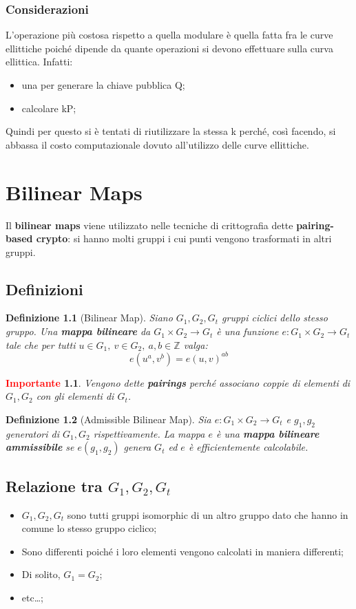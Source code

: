 \documentclass{book}
\newtheorem{Definizione}{\textbf{Definizione}}
\newtheorem*{Importante}{\textbf{\textcolor{red}{Importante}}}
\begin{document}
\subsection{Considerazioni}
L'operazione più costosa rispetto a quella modulare è quella fatta fra le curve ellittiche poiché dipende da quante operazioni si devono effettuare sulla curva ellittica. Infatti:
\begin{itemize}
	\item una per generare la chiave pubblica Q\@;
	\item calcolare kP\@;
\end{itemize}
Quindi per questo si è tentati di riutilizzare la stessa k perché, così facendo, si abbassa il costo computazionale dovuto all'utilizzo delle curve ellittiche.
\chapter{Bilinear Maps}
Il \textbf{bilinear maps} viene utilizzato nelle tecniche di crittografia dette \textbf{pairing-based crypto}: si hanno molti gruppi i cui punti vengono trasformati in altri gruppi.
\section{Definizioni}
\begin{Definizione}[Bilinear Map]
	Siano \(G_{1},G_{2},G_{t}\) gruppi ciclici dello stesso gruppo. Una \textbf{mappa bilineare} da \(G_{1}\times G_{2}\rightarrow G_{t}\) è una funzione \(e:G_{1}\times G_{2}\rightarrow G_{t}\) tale che per tutti \(u\in G_{1},\ v\in G_{2},\ a,b\in \mathbb{Z}\) valga:\begin{equation*}
		e(u^{a},v^{b})={e(u,v)}^{ab}
	\end{equation*}
\end{Definizione}
\begin{Importante}
	Vengono dette \textbf{pairings} perché associano coppie di elementi di \(G_{1},G_{2}\) con gli elementi di \(G_{t}\).
\end{Importante}
\begin{Definizione}[Admissible Bilinear Map]
	Sia \(e:G_{1}\times G_{2}\rightarrow G_{t}\) e \(g_{1},g_{2}\) generatori di \(G_{1},G_{2}\) rispettivamente. La mappa \(e\) è una \textbf{mappa bilineare ammissibile} se \(e(g_{1},g_{2})\) genera \(G_{t}\) ed \(e\) è efficientemente calcolabile.
\end{Definizione}
\section{Relazione tra \(G_{1},G_{2},G_{t}\)}
\begin{itemize}
	\item \(G_{1},G_{2},G_{t}\) sono tutti gruppi isomorphic di un altro gruppo dato che hanno in comune lo stesso gruppo ciclico;
	\item Sono differenti poiché i loro elementi vengono calcolati in maniera differenti;
	\item Di solito, \(G_{1}=G_{2}\);
	\item etc\dots;
\end{itemize}
\end{document}
